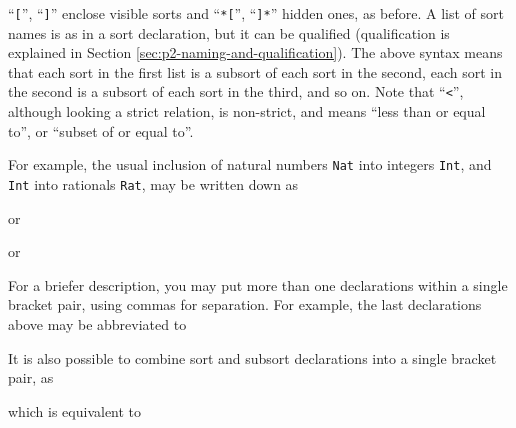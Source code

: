 \documentclass[a4paper]{memoir}
\begin{document}
``\verb|[|'', ``\verb|]|'' enclose visible sorts and ``\verb|*[|'',
``\verb|]*|'' hidden ones, as before.
A list of sort names is as in a sort declaration, but it can be
qualified (qualification is explained in Section
\ref{sec:p2-naming-and-qualification}). The above syntax means
that each sort in the first list is a subsort of each sort in the
second, each sort in the second is a subsort of each sort in
the third, and so on. Note that ``\verb|<|'', although looking a
strict relation, is non-strict, and means ``less than or equal to'', or
``subset of or equal to''.

For example, the usual inclusion of natural numbers \verb|Nat| into
integers \verb|Int|, and \verb|Int| into rationals \verb|Rat|, may be
written down as
\begin{vvtm}
\begin{ccode}
\end{ccode}
\end{vvtm}
or
\begin{vvtm}
\begin{ccode}
\end{ccode}
\end{vvtm}
or
\begin{vvtm}
\begin{ccode}
\end{ccode}
\end{vvtm}
For a briefer description, you may put more than one declarations within
a single bracket pair, using commas for separation. For example, the last
declarations above may be abbreviated to
\begin{vvtm}
\begin{ccode}
\end{ccode}
\end{vvtm}
It is also possible to combine sort and subsort declarations into a
single bracket pair, as
\begin{vvtm}
\begin{ccode}
\end{ccode}
\end{vvtm}
which is equivalent to
\begin{vvtm}
\begin{ccode}
\end{ccode}
\end{vvtm}
\end{document}
